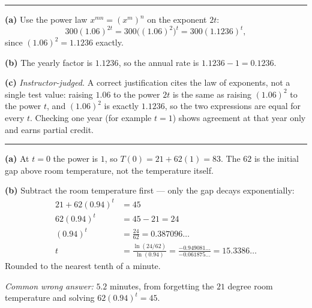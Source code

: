\documentclass[12pt]{article}
\begin{document}
\vspace{0.2cm}\noindent\rule{\linewidth}{0.2pt}\vspace{0.2cm}


\textbf{(a)} Use the power law $x^{mn} = (x^{m})^{n}$ on the exponent $2t$:
\[ 300(1.06)^{2t} = 300\bigl((1.06)^{2}\bigr)^{t} = 300(1.1236)^{t}, \]
since $(1.06)^2 = 1.1236$ exactly. 

\textbf{(b)} The yearly factor is $1.1236$, so the annual rate is $1.1236 - 1 = 0.1236$. 

\textbf{(c)} \emph{Instructor-judged.} A correct justification cites the law of exponents, not a single test value: raising $1.06$ to the power $2t$ is the same as raising $(1.06)^2$ to the power $t$, and $(1.06)^2$ is exactly $1.1236$, so the two expressions are equal for every $t$. Checking one year (for example $t = 1$) shows agreement at that year only and earns partial credit.

\vspace{0.2cm}\noindent\rule{\linewidth}{0.2pt}\vspace{0.2cm}


\textbf{(a)} At $t = 0$ the power is $1$, so $T(0) = 21 + 62(1) = 83$. The $62$ is the initial gap above room temperature, not the temperature itself. 

\textbf{(b)} Subtract the room temperature first --- only the gap decays exponentially:
\begin{align*}
  21 + 62(0.94)^t &= 45 \\
  62(0.94)^t &= 45 - 21 = 24 \\
  (0.94)^t &= \frac{24}{62} = 0.387096\ldots \\
  t &= \frac{\ln(24/62)}{\ln(0.94)} = \frac{-0.949081\ldots}{-0.061875\ldots} = 15.3386\ldots
\end{align*}
Rounded to the nearest tenth of a minute. 

\smallskip
\noindent\textit{Common wrong answer:} $5.2$ minutes, from forgetting the $21$ degree room temperature and solving $62(0.94)^t = 45$.
\end{document}
